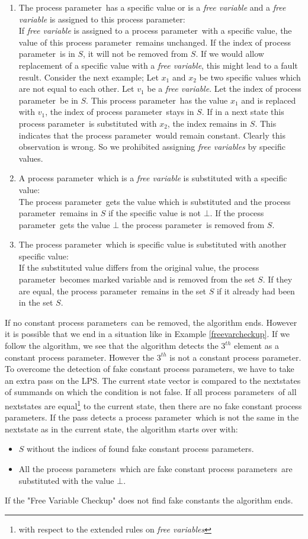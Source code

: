 \index{}\documentclass[a4paper,10pt]{article}
\theoremstyle{plain}
\theoremstyle{definition}
\newcommand{\pp}{process parameter}
\newcommand{\pps}{process parameters}
\newcommand{\ti}{\textit}
\begin{document}
\begin{enumerate}
\item The \pp\ has a specific value or is a \ti{free variable} and a \ti{free variable} is assigned to this \pp :\\
If \ti{free variable} is assigned to a \pp\ with a specific value, the value of this \pp\ remains unchanged. If the index of \pp\ is in $S$, it will not be removed from $S$. If we would allow replacement of a specific value with a \ti{free variable}, this might lead to a fault result. Consider the next example; Let $x_1$ and $x_2$ be two specific values which are not equal to each other. Let $v_1$ be a \ti{free variable}. Let the index of \pp\ be in $S$. This \pp\ has the value $x_1$ and is replaced with $v_1$, the index of \pp\ stays in $S$. If in a next state this \pp\ is substituted with $x_2$, the index remains in $S$. This indicates that the \pp\ would remain constant. Clearly this observation is wrong. So we prohibited assigning \ti{free variables} by specific values.

\item A \pp\ which is a \ti{free variable} is substituted with a specific value:\\
The \pp\ gets the value which is substituted and the \pp\ remains in $S$ if the specific value is not $\bot$. If the \pp\ gets the value $\bot$ the \pp\ is removed from $S$.

\item The \pp\ which is specific value is substituted with another specific value:\\
If the substituted value differs from the original value, the \pp\ becomes marked variable and is removed from the set $S$.
If they are equal, the \pp\ remains in the set $S$ if it already had been in the set $S$.
\end{enumerate}

If no constant \pps\ can be removed, the algorithm ends. However it is possible that we end in a situation like in Example \ref{freevarcheckup}. If we follow the algorithm, we see that the algorithm detects the $3^{th}$ element as a constant \pp. However the $3^{th}$ is not a constant \pp . To overcome the detection of fake constant \pps , we have to take an extra pass on the LPS. The current state vector is compared to the nextstates of summands on which the condition is not false.
If all \pps\ of all nextstates are equal\footnote{with respect to the extended rules on \ti{free variables}} to the current state, then there are no fake constant \pps . If the pass detects a \pp\ which is not the same in the nextstate as in the current state, the algorithm starts over with:
\begin{itemize}
\item $S$ without the indices of found fake constant \pps .
\item All the \pps\ which are fake constant \pps\ are substituted with the value $\bot$. 
\end{itemize}
If the "Free Variable Checkup" does not find fake constants the algorithm ends.
\end{document}
